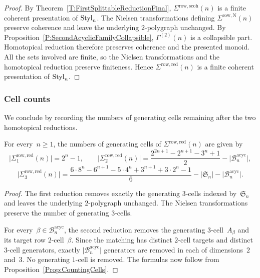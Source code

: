 \documentclass[a4paper, twoside, 11pt, english]{article}
\begin{document}
\begin{proof}
By Theorem~\ref{T:FirstSplittableReductionFinal},
$\Sigma^{\mathrm{row,scoh}}(n)$ is a finite coherent presentation of
$\mathrm{Styl}_n$. The Nielsen transformations defining
$\Sigma^{\mathrm{row,N}}(n)$ preserve coherence and leave the
underlying $2$-polygraph unchanged. By
Proposition~\ref{P:SecondAcyclicFamilyCollapsible},
$\Gamma^{(2)}(n)$ is a collapsible part. Homotopical reduction
therefore preserves coherence and the presented monoid. All the sets
involved are finite, so the Nielsen transformations and the
homotopical reduction preserve finiteness. Hence
$\Sigma^{\mathrm{row,red}}(n)$ is a finite coherent presentation of
$\mathrm{Styl}_n$.
\end{proof}



\subsubsection{Cell counts}

We conclude by recording the numbers of generating cells remaining
after the two homotopical reductions.

\begin{proposition}
\label{P:CountsAfterSecondReduction}
For every~$n\geq1$, the numbers of generating cells of
$\Sigma^{\mathrm{row,red}}(n)$ are given by
\[
\bigl|\Sigma^{\mathrm{row,red}}_1(n)\bigr|
=
2^n-1,
\qquad
\bigl|\Sigma^{\mathrm{row,red}}_2(n)\bigr|
=
\frac{
2^{2n+1}-2^{n+1}-3^n+1
}{2}
-
\bigl|\mathcal B_n^{\mathrm{acyc}}\bigr|,
\]
\[
\bigl|\Sigma^{\mathrm{row,red}}_3(n)\bigr|
=
\frac{
6\cdot8^n-6^{n+1}-5\cdot4^n+3^{n+1}
+3\cdot2^n-1
}{6}
-
\bigl|\mathfrak S_n\bigr|
-
\bigl|\mathcal B_n^{\mathrm{acyc}}\bigr|.
\]
\end{proposition}

\begin{proof}
The first reduction removes exactly the generating $3$-cells indexed
by~$\mathfrak S_n$ and leaves the underlying $2$-polygraph unchanged.
The Nielsen transformations preserve the number of generating
$3$-cells.

For every~$\beta\in\mathcal B_n^{\mathrm{acyc}}$, the second reduction
removes the generating $3$-cell~$A_\beta$ and its target row
$2$-cell~$\beta$. Since the matching has distinct $2$-cell targets and
distinct $3$-cell generators, exactly
$\bigl|\mathcal B_n^{\mathrm{acyc}}\bigr|$ generators are removed in
each of dimensions~$2$ and~$3$. No generating $1$-cell is removed.
The formulas now follow from Proposition~\ref{Prop:CountingCells}.
\end{proof}
\end{document}
